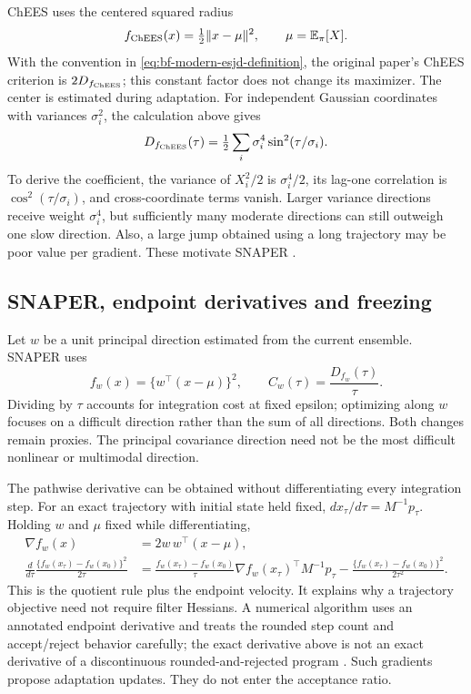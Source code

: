 ChEES uses the centered squared radius
\begin{equation}
 f_{\rm ChEES}(x)=\tfrac12\|x-\mu\|^2,\qquad
 \mu=\mathbb{E}_\pi[X].
 \label{eq:bf-modern-chees}
\end{equation}
With the convention in \eqref{eq:bf-modern-esjd-definition}, the original
paper's ChEES criterion is $2D_{f_{\rm ChEES}}$; this constant factor does
not change its maximizer. The center is estimated during adaptation.
For independent Gaussian
coordinates with variances $\sigma_i^2$, the calculation above gives
\begin{equation}
 D_{f_{\rm ChEES}}(\tau)
       =\tfrac12\sum_i\sigma_i^4\sin^2(\tau/\sigma_i).
 \label{eq:bf-modern-chees-gaussian}
\end{equation}
To derive the coefficient, the variance of $X_i^2/2$ is
$\sigma_i^4/2$, its lag-one correlation is
$\cos^2(\tau/\sigma_i)$, and cross-coordinate terms vanish. Larger
variance directions receive weight $\sigma_i^4$, but sufficiently many
moderate directions can still outweigh one slow direction. Also, a large
jump obtained using a long trajectory may be poor value per gradient. These
motivate SNAPER \citep{hoffman2021chees,sountsov2022snaper}.

\subsection{SNAPER, endpoint derivatives and freezing}

Let $w$ be a unit principal direction estimated from the current ensemble.
SNAPER uses
\begin{equation}
 f_w(x)=\{w^\top(x-\mu)\}^2,\qquad
 C_w(\tau)=\frac{D_{f_w}(\tau)}{\tau}.
 \label{eq:bf-modern-snaper}
\end{equation}
Dividing by $\tau$ accounts for integration cost at fixed epsilon; optimizing
along $w$ focuses on a difficult direction rather than the sum of all
directions. Both changes remain proxies. The principal covariance direction
need not be the most difficult nonlinear or multimodal direction.

The pathwise derivative can be obtained without differentiating every
integration step. For an exact trajectory with initial state held fixed,
$d x_\tau/d\tau=M^{-1}p_\tau$. Holding $w$ and $\mu$ fixed while
differentiating,
\begin{align}
 \nabla f_w(x)&=2w\,w^\top(x-\mu),\\
 \frac{d}{d\tau}\frac{\{f_w(x_\tau)-f_w(x_0)\}^2}{2\tau}
 &=\frac{f_w(x_\tau)-f_w(x_0)}{\tau}
       \nabla f_w(x_\tau)^\top M^{-1}p_\tau
   -\frac{\{f_w(x_\tau)-f_w(x_0)\}^2}{2\tau^2}.
 \label{eq:bf-modern-snaper-derivative}
\end{align}
This is the quotient rule plus the endpoint velocity. It explains why a
trajectory objective need not require filter Hessians. A numerical algorithm
uses an annotated endpoint derivative and treats the rounded step count and
accept/reject behavior carefully; the exact derivative above is not an exact
derivative of a discontinuous rounded-and-rejected program
\citep[Appendix C]{sountsov2022snaper}. Such gradients propose adaptation
updates. They do not enter the acceptance ratio.

